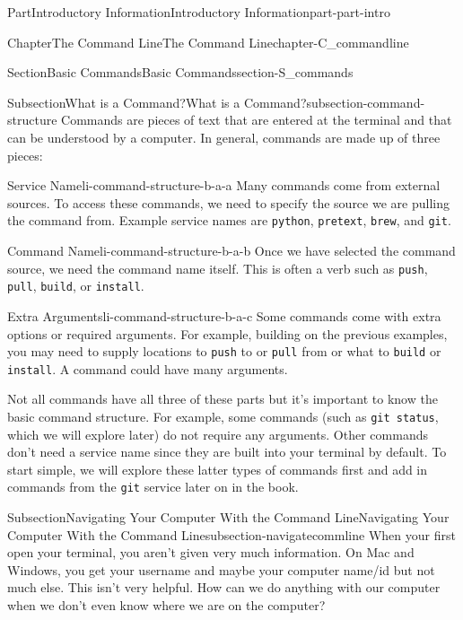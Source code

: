 \documentclass[twoside,10pt,]{book}
\newcommand{\mono}[1]{\texttt{#1}}
\begin{document}
\begin{partptx}{Part}{Introductory Information}{}{Introductory Information}{}{}{part-part-intro}
\begin{chapterptx}{Chapter}{The Command Line}{}{The Command Line}{}{}{chapter-C_commandline}
\begin{sectionptx}{Section}{Basic Commands}{}{Basic Commands}{}{}{section-S_commands}
%
\begin{subsectionptx}{Subsection}{What is a Command?}{}{What is a Command?}{}{}{subsection-command-structure}
Commands are pieces of text that are entered at the terminal and that can be understood by a computer. In general, commands are made up of three pieces:%
\begin{descriptionlist}
\begin{dlimedium}{Service Name}{li-command-structure-b-a-a}%
Many commands come from external sources. To access these commands, we need to specify the source we are pulling the command from. Example service names are \mono{python}, \mono{pretext}, \mono{brew}, and \mono{git}.%
\end{dlimedium}%
\begin{dlimedium}{Command Name}{li-command-structure-b-a-b}%
Once we have selected the command source, we need the command name itself. This is often a verb such as \mono{push}, \mono{pull}, \mono{build}, or \mono{install}.%
\end{dlimedium}%
\begin{dlimedium}{Extra Arguments}{li-command-structure-b-a-c}%
Some commands come with extra options or required arguments. For example, building on the previous examples, you may need to supply locations to \mono{push} to or \mono{pull} from or what to \mono{build} or \mono{install}. A command could have many arguments.%
\end{dlimedium}%
\end{descriptionlist}
%
\par
Not all commands have all three of these parts but it's important to know the basic command structure. For example, some commands (such as \mono{git status}, which we will explore later) do not require any arguments. Other commands don't need a service name since they are built into your terminal by default. To start simple, we will explore these latter types of commands first and add in commands from the \mono{git} service later on in the book.%
\end{subsectionptx}
%
%
\typeout{************************************************}
\typeout{************************************************}
%
\begin{subsectionptx}{Subsection}{Navigating Your Computer With the Command Line}{}{Navigating Your Computer With the Command Line}{}{}{subsection-navigatecommline}
%
When your first open your terminal, you aren't given very much information. On Mac and Windows, you get your username and maybe your computer name\slash{}id but not much else. This isn't very helpful. How can we do anything with our computer when we don't even know where we are on the computer?%

\end{subsectionptx}
\end{sectionptx}
\end{chapterptx}
\end{partptx}
\end{document}
